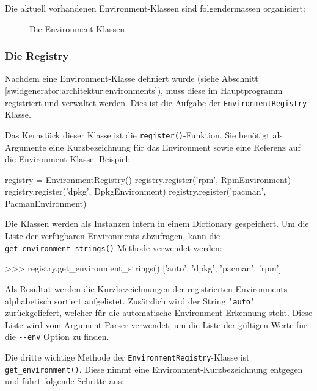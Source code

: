 Die aktuell vorhandenen Environment-Klassen sind folgendermassen organisiert:

\begin{figure}[H]
	\centering
	\resizebox{\textwidth}{!}{%
		
	}
	\caption{Die Environment-Klassen}
	\label{img:environment-klassendiagramm}
\end{figure}


\subsubsection{Die Registry}
\label{swidgenerator:architektur:environments:registry}

Nachdem eine Environment-Klasse definiert wurde (siehe Abschnitt
\ref{swidgenerator:architektur:environments}), muss diese im Hauptprogramm
registriert und verwaltet werden. Dies ist die Aufgabe der
\texttt{EnvironmentRegistry}-Klasse.

Das Kernstück dieser Klasse ist die \texttt{register()}-Funktion. Sie benötigt als
Argumente eine Kurzbezeichnung für das Environment sowie eine Referenz auf die
Environment-Klasse. Beispiel:

\begin{pythoncode}
registry = EnvironmentRegistry()
registry.register('rpm', RpmEnvironment)
registry.register('dpkg', DpkgEnvironment)
registry.register('pacman', PacmanEnvironment)
\end{pythoncode}

Die Klassen werden als Instanzen intern in einem Dictionary gespeichert. Um die
Liste der verfügbaren Environments abzufragen, kann die
\texttt{get\_environment\_strings()} Methode verwendet werden:

\begin{pythoncode}
>>> registry.get_environment_strings()
['auto', 'dpkg', 'pacman', 'rpm']
\end{pythoncode}

Als Resultat werden die Kurzbezeichnungen der registrierten Environments
alphabetisch sortiert aufgelistet. Zusätzlich wird der String \texttt{'auto'}
zurückgeliefert, welcher für die automatische Environment Erkennung steht. Diese
Liste wird vom Argument Parser verwendet, um die Liste der gültigen Werte für die
\texttt{-{}-env} Option zu finden.

Die dritte wichtige Methode der \texttt{EnvironmentRegistry}-Klasse ist
\texttt{get\_environment()}. Diese nimmt eine Environment-Kurzbezeichnung
entgegen und führt folgende Schritte aus:

